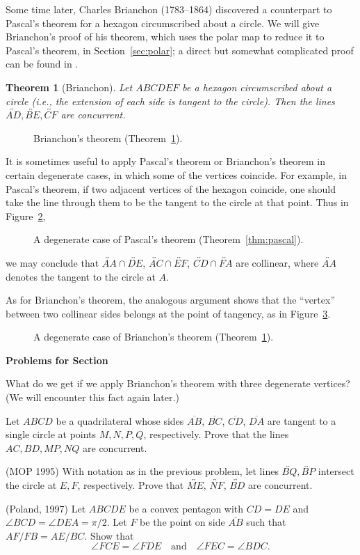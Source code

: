 \documentclass[12pt]{book}
\newcounter{exc}
\numberwithin{exc}{section}
\numberwithin{figure}{section}
\newenvironment{exer}{\vspace{0.1in}
\noindent \textbf{Problems for Section~\thesection} \vspace{0.1in}
\begin{list}{\arabic{exc}.}{\usecounter{exc}}}{\end{list}}
\newtheorem{theorem}{Theorem}[section]
\numberwithin{equation}{theorem}
\def\ii{\item}
\def\ang{\angle}
\def\line#1{\overleftrightarrow{#1}}
\def\seg#1{\overline{#1}}
\begin{document}
Some time later, Charles Brianchon (1783--1864) 
discovered a
counterpart to Pascal's theorem  
for a hexagon circumscribed about a 
circle. We will give Brianchon's proof of his theorem, which uses the
polar map to reduce it to Pascal's theorem, in Section~\ref{sec:polar}; a
direct but somewhat complicated proof can be found in \cite{bib:cg}.
\begin{theorem}[Brianchon] \label{thm:brianchon}
Let $ABCDEF$ be a hexagon circumscribed about a circle (i.e., the extension
of each side is tangent to the circle). Then the lines 
$\line{AD}, \line{BE}, \line{CF}$ are concurrent.
\end{theorem}
\begin{figure}[ht]
\caption{Brianchon's theorem (Theorem~\ref{thm:brianchon}).}
\label{fig:brianchon}
\end{figure}

It is sometimes useful to apply Pascal's theorem or
Brianchon's theorem in certain degenerate 
cases, in which some of the vertices coincide. For example, 
in Pascal's theorem, if two adjacent vertices of the hexagon coincide,
one should take the line through them to be the tangent to the circle at 
that point. Thus in Figure~\ref{fig:pascal degen},
\begin{figure}[ht]
\caption{A degenerate case of Pascal's theorem (Theorem~\ref{thm:pascal}).}
\label{fig:pascal degen}
\end{figure}
we may conclude that $\line{AA} \cap \line{DE}$, $\line{AC} \cap \line{EF}$, 
$\line{CD} \cap \line{FA}$ are collinear, where 
$\line{AA}$ denotes the tangent to the circle at $A$.

As for Brianchon's theorem, 
the analogous argument shows that the ``vertex'' between two 
collinear sides belongs at the point of tangency, as in
Figure~\ref{fig:brianchon degen}.
\begin{figure}[ht]
\caption{A degenerate case of Brianchon's theorem 
(Theorem~\ref{thm:brianchon}).}
\label{fig:brianchon degen}
\end{figure}

\begin{exer}
\ii
What do we get if we apply Brianchon's theorem with three degenerate 
vertices? (We will encounter this fact again later.)
\ii
Let $ABCD$ be a quadrilateral whose sides $\seg{AB}$, $\seg{BC}$, $\seg{CD}$,
$\seg{DA}$ are tangent to a single circle at 
points $M,N,P,Q$, respectively. Prove that the lines $AC, 
BD, MP, NQ$ are concurrent.
\ii 
(MOP 1995)
With notation as in the previous problem, let
lines $\line{BQ}, \line{BP}$ intersect the circle at $E,F$, 
respectively. Prove that $\line{ME}$, $\line{NF}$, $\line{BD}$
are concurrent.
\ii (Poland, 1997) \label{ex:pol1997}
Let $ABCDE$ be a convex pentagon with $CD = DE$ and $\angle 
BCD = \angle DEA = \pi/2$. Let $F$ be the point on side $\seg{AB}$ such 
that $AF/FB = AE/BC$. Show that
\[
\ang FCE = \ang FDE \quad \mbox{and} \quad \ang FEC = \ang BDC.
\]
\end{exer}
\end{document}
